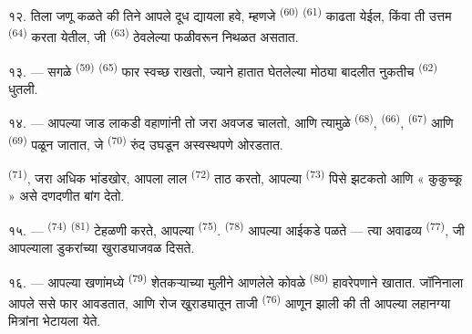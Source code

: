 १२. तिला जणू कळते की तिने आपले दूध द्यायला हवे, म्हणजे 
\textsuperscript{(60)}  \textsuperscript{(61)}  काढता येईल, किंवा ती
उत्तम  \textsuperscript{(64)} करता येतील, जी 
\textsuperscript{(63)} ठेवलेल्या फळीवरून निथळत असतात.

१३. --- सगळे  \textsuperscript{(59)}  \textsuperscript{(65)} फार
स्वच्छ राखतो, ज्याने हातात घेतलेल्या मोठ्या बादलीत नुकतीच 
\textsuperscript{(62)} धुतली.

\VUsaut{3.0mm}
\VUsaut{3.0mm}

१४. --- आपल्या जाड लाकडी वहाणांनी तो जरा अवजड चालतो, आणि त्यामुळे 
\textsuperscript{(68)},  \textsuperscript{(66)}, 
\textsuperscript{(67)} आणि  \textsuperscript{(69)} पळून जातात, जे
 \textsuperscript{(70)} रुंद उघडून अस्वस्थपणे ओरडतात.

 \textsuperscript{(71)}, जरा अधिक भांडखोर, आपला लाल  \textsuperscript{(72)} ताठ करतो, आपल्या  \textsuperscript{(73)} पिसे झटकतो आणि « कुकुच्कू » असे दणदणीत बांग देतो.

१५. ---  \textsuperscript{(74)}  \textsuperscript{(81)}
टेहळणी करते, आपल्या  \textsuperscript{(75)}. 
\textsuperscript{(78)} आपल्या आईकडे पळते — त्या अवाढव्य 
\textsuperscript{(77)}, जी आपल्याला डुकरांच्या खुराड्याजवळ दिसते.

१६. --- आपल्या खणांमध्ये  \textsuperscript{(79)} शेतकऱ्याच्या मुलीने आणलेले कोवळे
 \textsuperscript{(80)} हावरेपणाने खातात. जॉनिनाला आपले ससे फार आवडतात, आणि रोज
खुराड्यातून ताजी  \textsuperscript{(76)} आणून झाली की ती आपल्या लहानग्या
मित्रांना भेटायला येते.

\VUsaut{6.0mm}
\VUfilet{22mm}
